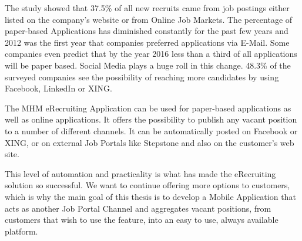 The study showed that 37.5\% of all new recruits came from job postings either listed on the company's website or from Online Job Markets. The percentage of paper-based Applications has diminished constantly for the past few years and 2012 was the first year that companies preferred applications via E-Mail. Some companies even predict that by the year 2016 less than a third of all applications will be paper based. Social Media plays a huge roll in this change. 48.3\% of the surveyed companies see the possibility of reaching more candidates by using Facebook, LinkedIn or XING.\cite[p. 8]{weitzel:2012}

The MHM eRecruiting Application can be used for paper-based applications as well as online applications. It offers the possibility to publish any vacant position to a number of different channels. It can be automatically posted on Facebook or XING, or on external Job Portals like Stepstone and also on the customer's web site.

This level of automation and practicality is what has made the eRecruiting solution so successful. We want to continue offering more options to customers, which is why the main goal of this thesis is to develop a Mobile Application that acts as another Job Portal Channel and aggregates vacant positions, from customers that wish to use the feature, into an easy to use, always available platform. %


















 
   
